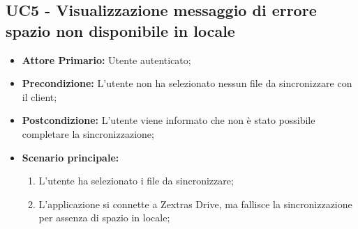 \subsection{UC5 - Visualizzazione messaggio di errore spazio non disponibile in locale}
\label{UC7}
\begin{itemize}
\item \textbf{Attore Primario:} Utente autenticato;
\item \textbf{Precondizione:} L'utente non ha selezionato nessun file da sincronizzare con il client;
\item \textbf{Postcondizione:} L'utente viene informato che non è stato possibile completare la sincronizzazione;
\item \textbf{Scenario principale:}
    \begin{enumerate}
    \item L'utente ha selezionato i file da sincronizzare;
    \item L'applicazione si connette a Zextras Drive, ma fallisce la sincronizzazione per assenza di spazio in locale;
    \end{enumerate}
\end{itemize}
